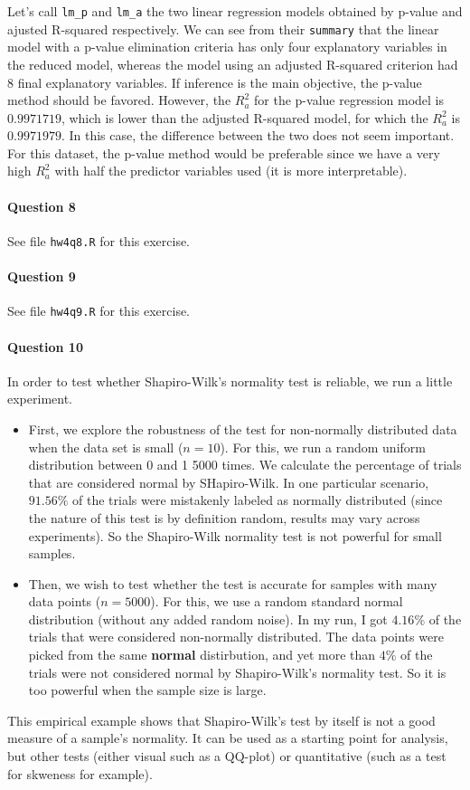 \documentclass[]{article}
\let\oldparagraph\paragraph
\renewcommand{\paragraph}[1]{\oldparagraph{#1}\mbox{}}
\begin{document}
Let's call \texttt{lm\_p} and \texttt{lm\_a} the two linear regression models obtained by p-value and ajusted R-squared respectively. We can see from their \texttt{summary} that the linear model with a p-value elimination criteria has only four explanatory variables in the reduced model, whereas the model using an adjusted R-squared criterion had 8 final explanatory variables. If inference is the main objective, the p-value method should be favored. However, the $R^2_a$ for the p-value regression model is $0.9971719$, which is lower than the adjusted R-squared model, for which the $R^2_a$ is $0.9971979$. In this case, the difference between the two does not seem important. For this dataset, the p-value method would be preferable since we have a very high $R^2_a$ with half the predictor variables used (it is more interpretable).

\paragraph{\Large Question 8}\normalsize

See file \texttt{hw4q8.R} for this exercise.

\paragraph{\Large Question 9}\normalsize

See file \texttt{hw4q9.R} for this exercise.

\paragraph{\Large Question 10}\normalsize

In order to test whether Shapiro-Wilk's normality test is reliable, we run a little experiment.

\begin{itemize}
\item First, we explore the robustness of the test for non-normally distributed data when the data set is small ($n = 10$). For this, we run a random uniform distribution between 0 and 1 5000 times. We calculate the percentage of trials that are considered normal by SHapiro-Wilk. In one particular scenario, $91.56\%$ of the trials were mistakenly labeled as normally distributed (since the nature of this test is by definition random, results may vary across experiments). So the Shapiro-Wilk normality test is not powerful for small samples. 
\item Then, we wish to test whether the test is accurate for samples with many data points ($n = 5000$). For this, we use a random standard normal distribution (without any added random noise). In my run, I got $4.16\%$ of the trials that were considered non-normally distributed. The data points were picked from the same \textbf{normal} distirbution, and yet more than $4\%$ of the trials were not considered normal by Shapiro-Wilk's normality test. So it is too powerful when the sample size is large.
\end{itemize}

This empirical example shows that Shapiro-Wilk's test by itself is not a good measure of a sample's normality. It can be used as a starting point for analysis, but other tests (either visual such as a QQ-plot) or quantitative (such as a test for skweness for example).
\end{document}
